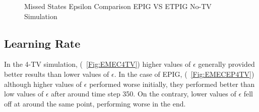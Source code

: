 \documentclass[12pt]{thesis}
\begin{document}
\begin{figure}
	\begin{center}
		\hfill
			
		\hfill
	\end{center}
	\caption{Missed States Epsilon Comparison EPIG VS ETPIG No-TV Simulation}
	\label{Fig:EMEC0TV}
\end{figure}

\subsection{Learning Rate}
In the 4-TV simulation, (\figurename~\ref{Fig:EMEC4TV}) higher values of $\epsilon$ generally provided better results than lower values of $\epsilon$. In the case of EPIG, (\figurename~\ref{Fig:EMECEP4TV}) although higher values of $\epsilon$ performed worse initially, they performed better than low values of $\epsilon$ after around time step 350. On the contrary, lower values of $\epsilon$ fell off at around the same point, performing worse in the end.
\end{document}
